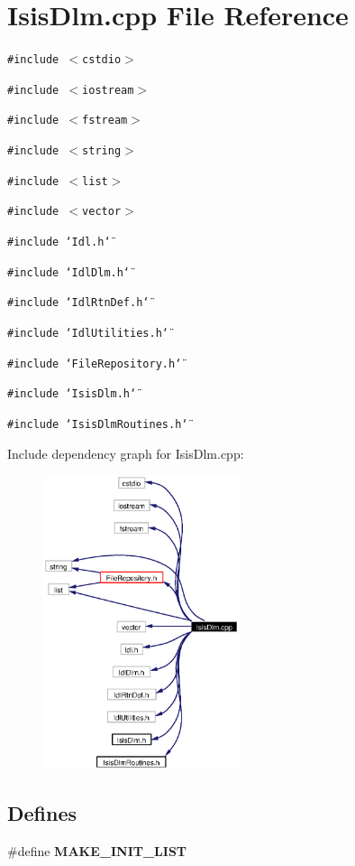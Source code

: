 \section{Isis\-Dlm.cpp File Reference}
\label{IsisDlm_8cpp}
{\tt \#include $<$cstdio$>$}\par
{\tt \#include $<$iostream$>$}\par
{\tt \#include $<$fstream$>$}\par
{\tt \#include $<$string$>$}\par
{\tt \#include $<$list$>$}\par
{\tt \#include $<$vector$>$}\par
{\tt \#include \char`\"{}Idl.h\char`\"{}}\par
{\tt \#include \char`\"{}Idl\-Dlm.h\char`\"{}}\par
{\tt \#include \char`\"{}Idl\-Rtn\-Def.h\char`\"{}}\par
{\tt \#include \char`\"{}Idl\-Utilities.h\char`\"{}}\par
{\tt \#include \char`\"{}File\-Repository.h\char`\"{}}\par
{\tt \#include \char`\"{}Isis\-Dlm.h\char`\"{}}\par
{\tt \#include \char`\"{}Isis\-Dlm\-Routines.h\char`\"{}}\par


Include dependency graph for Isis\-Dlm.cpp:\begin{figure}[H]
\begin{center}
\leavevmode
\includegraphics[width=163pt]{IsisDlm_8cpp__incl}
\end{center}
\end{figure}
\subsection*{Defines}
\begin{CompactItemize}
\item 
\#define {\bf MAKE\_\-INIT\_\-LIST}
\end{CompactItemize}
